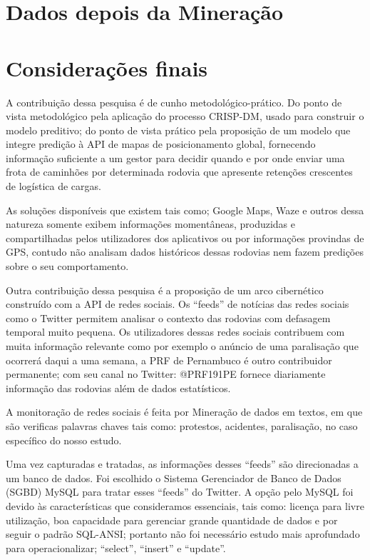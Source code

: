 \documentclass[conference,compsoc]{IEEEtran}
\begin{document}
\section{Dados depois da Mineração}




\section{Considerações finais}

A contribuição dessa pesquisa é de cunho metodológico-prático.
Do ponto de vista metodológico pela aplicação do processo CRISP-DM, usado para construir o modelo preditivo; do ponto de vista prático 
pela proposição de um modelo que integre predição à API de mapas de posicionamento global, fornecendo informação suficiente a um gestor para decidir quando 
e por onde enviar uma frota de caminhões por determinada rodovia que apresente retenções crescentes de logística de cargas. 

As soluções disponíveis que existem tais como; Google Maps, Waze e outros dessa natureza somente exibem informações momentâneas, produzidas e compartilhadas pelos utilizadores 
dos aplicativos ou por informações provindas de GPS, contudo não analisam dados históricos dessas rodovias nem fazem predições sobre o seu comportamento.

Outra contribuição dessa pesquisa é a proposição de um arco cibernético construído com a API de redes sociais.
Os ``feeds'' de notícias das redes sociais como o Twitter permitem analisar o contexto das rodovias com defasagem temporal muito pequena.
Os utilizadores dessas redes sociais contribuem com muita informação relevante como por exemplo o anúncio de uma paralisação que ocorrerá 
daqui a uma semana, a PRF de Pernambuco é outro contribuidor permanente; com seu canal no Twitter: @PRF191PE fornece diariamente informação das rodovias 
além de dados estatísticos. 

A monitoração de redes sociais é feita por Mineração de dados em textos, em que são verificas palavras chaves tais como: protestos, acidentes, paralisação, no caso
específico do nosso estudo.

Uma vez capturadas e tratadas, as informações desses ``feeds'' são direcionadas a um banco de dados. 
Foi escolhido o Sistema Gerenciador de Banco de Dados (SGBD) MySQL para tratar esses ``feeds'' do Twitter. 
A opção pelo MySQL foi devido às características que consideramos essenciais, tais como: licença para livre utilização, boa capacidade para gerenciar grande quantidade de 
dados e por seguir o padrão SQL-ANSI; portanto não foi necessário estudo mais aprofundado para operacionalizar; ``select'', ``insert'' e ``update''.
\end{document}
